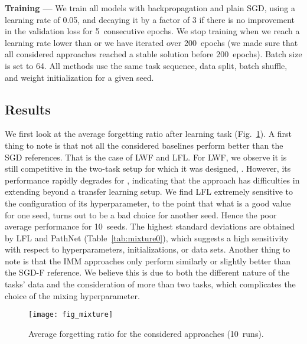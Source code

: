 \textbf{Training ---} We train all models with backpropagation and plain SGD, using a learning rate of 0.05, and decaying it by a factor of 3 if there is no improvement in the validation loss for 5~consecutive epochs. We stop training when we reach a learning rate lower than  or we have iterated over 200~epochs (we made sure that all considered approaches reached a stable solution before 200~epochs). Batch size is set to 64. All methods use the same task sequence, data split, batch shuffle, and weight initialization for a given seed. 

\subsection{Results}
\label{sec:Exper_Mixture}

We first look at the average forgetting ratio  after learning task  (Fig.~\ref{fig:mixture}). A first thing to note is that not all the considered baselines perform better than the SGD references. That is the case of LWF and LFL. For LWF, we observe it is still competitive in the two-task setup for which it was designed, . However, its performance rapidly degrades for , indicating that the approach has difficulties in extending beyond a transfer learning setup. We find LFL extremely sensitive to the configuration of its hyperparameter, to the point that what is a good value for one seed, turns out to be a bad choice for another seed. Hence the poor average performance for 10~seeds. The highest standard deviations are obtained by LFL and PathNet (Table~\ref{tab:mixture0}), which suggests a high sensitivity with respect to hyperparameters, initializations, or data sets. Another thing to note is that the IMM approaches only perform similarly or slightly better than the SGD-F reference. We believe this is due to both the different nature of the tasks' data and the consideration of more than two tasks, which complicates the choice of the mixing hyperparameter.

\begin{figure}[t]
\begin{center}
	\texttt{[image: fig\_mixture]}
\vskip -0.15in
	\caption{Average forgetting ratio  for the considered approaches (10~runs).}
	\label{fig:mixture}
	\end{center}
	\vskip -0.1in
\end{figure} 

